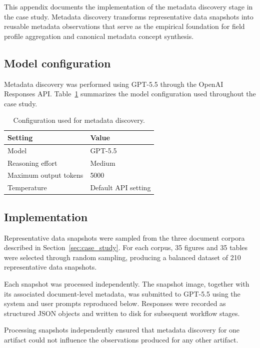 \documentclass{article}
\begin{document}
This appendix documents the implementation of the metadata discovery stage in the case study. Metadata discovery transforms representative data snapshots into reusable metadata observations that serve as the empirical foundation for field profile aggregation and canonical metadata concept synthesis.

\subsection{Model configuration}

Metadata discovery was performed using GPT-5.5 through the OpenAI Responses API. Table~\ref{tab:metadata_discovery_configuration} summarizes the model configuration used throughout the case study.

\begin{table}[!ht]
    \centering
    \caption{Configuration used for metadata discovery.}
    \label{tab:metadata_discovery_configuration}
    \begin{tabular}{ll}
    \toprule
    \textbf{Setting} & \textbf{Value} \\
    \midrule
    Model & GPT-5.5 \\
    Reasoning effort & Medium \\
    Maximum output tokens & 5000 \\
    Temperature & Default API setting \\
    \bottomrule
    \end{tabular}
\end{table}

\subsection{Implementation}

Representative data snapshots were sampled from the three document corpora described in Section~\ref{sec:case_study}. For each corpus, 35 figures and 35 tables were selected through random sampling, producing a balanced dataset of 210 representative data snapshots.

Each snapshot was processed independently. The snapshot image, together with its associated document-level metadata, was submitted to GPT-5.5 using the system and user prompts reproduced below. Responses were recorded as structured JSON objects and written to disk for subsequent workflow stages.

Processing snapshots independently ensured that metadata discovery for one artifact could not influence the observations produced for any other artifact.
\end{document}
